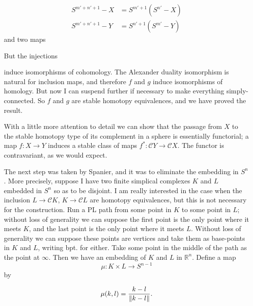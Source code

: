 \documentclass[../main]{subfiles}
\begin{document}
\begin{align*}
    S^{m'+n'+1}-X&=S^{m'+1}(S^{n'}-X)\\
    S^{m'+n'+1}-Y&=S^{n'+1}(S^{m'}-Y)
\end{align*}
and two maps
\begin{center}
\end{center}
But the injections 
\begin{center}
\end{center}
induce isomorphisms of cohomology. The Alexander duality isomorphism is natural for inclusion maps, and therefore $f$ and $g$ induce isomorphisms of homology. But now I can suspend further if necessary to make everything simply-connected. So $f$ and $g$ are stable homotopy equivalences, and we have proved the result.

With a little more attention to detail we can show that the passage from $X$ to the stable homotopy type of its complement in a sphere is essentially functorial; a map $f\colon X\longrightarrow Y$ induces a stable class of maps $f^{\ast}\colon\mathcal{C}Y\longrightarrow\mathcal{C}X$. The functor is contravariant, as we would expect.

The next step was taken by Spanier, and it was to eliminate the embedding in $S^n$. More precisely, suppose I have two finite simplical complexes $K$ and $L$ embedded in $S^n$ so as to be disjoint. I am really interested in the case when the inclusion $L\longrightarrow\mathcal{C}K$, $K\to\mathcal{C}L$ are homotopy equivalences, but this is not necessary for the construction. Run a PL path from some point in $K$ to some point in $L$; without loss of generality we can suppose the first point is the only point where it meets $K$, and the last point is the only point where it meets $L$. Without loss of generality we can suppose these points are vertices and take them as base-points in $K$ and $L$, writing bpt. for either. Take some point in the middle of the path as the point at $\infty$. Then we have an embedding of $K$ and $L$ in $\mathbb{R}^n$. Define a map $$\mu\colon K\times L\longrightarrow S^{n-1}$$by

\begin{equation*}
    \mu(k,l)=\frac{k-l}{\lVert k-l\rVert}.
\end{equation*}
\end{document}
